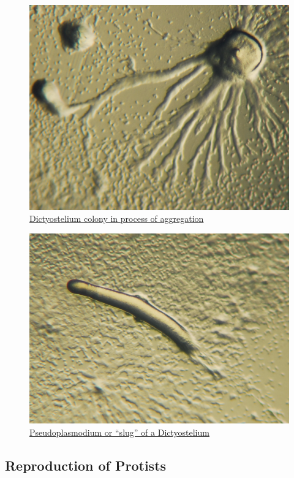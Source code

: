 \begin{figure}

{\centering \includegraphics[width=0.7\linewidth]{./figures/protista/Dictyostelium_Aggregation} 

}

\caption{\href{https://commons.wikimedia.org/wiki/File:Dictyostelium_Aggregation.JPG}{Dictyostelium colony in process of aggregation}}\label{fig:dictformcol}
\end{figure}



\begin{figure}

{\centering \includegraphics[width=0.7\linewidth]{./figures/protista/Dictyostelium_Pseudoplasmodium} 

}

\caption{\href{https://commons.wikimedia.org/wiki/File:Dictyostelium_Pseudoplasmodium.JPG}{Pseudoplasmodium or ``slug'' of a Dictyostelium}}\label{fig:dictslug}
\end{figure}

\hypertarget{reproduction-of-protists}{%
\subsection{Reproduction of Protists}\label{reproduction-of-protists}}

